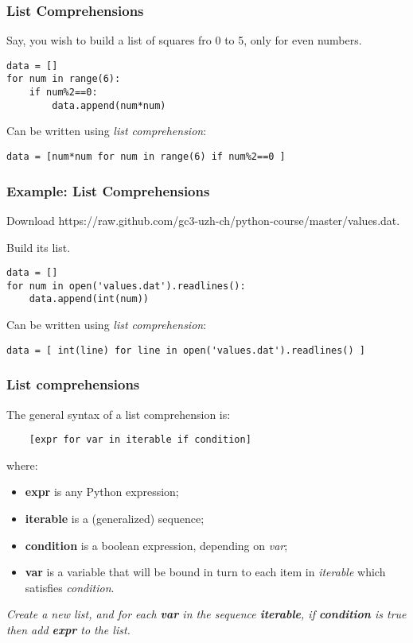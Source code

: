 \begin{frame}[fragile]\frametitle{List Comprehensions}
Say, you wish to build a list of squares fro 0 to 5, only for even numbers.
  \begin{lstlisting}
data = []
for num in range(6):
    if num%2==0:
        data.append(num*num)
  \end{lstlisting}
  
 Can be written using \textit{list comprehension}:
  \begin{lstlisting}
data = [num*num for num in range(6) if num%2==0 ]
  \end{lstlisting}

\end{frame}

\begin{frame}[fragile]\frametitle{Example: List Comprehensions}
 
Download  https://raw.github.com/gc3-uzh-ch/python-course/master/values.dat.

Build its list.
  \begin{lstlisting}
data = []
for num in open('values.dat').readlines():
    data.append(int(num))
  \end{lstlisting}
  
 Can be written using \textit{list comprehension}:
  \begin{lstlisting}
data = [ int(line) for line in open('values.dat').readlines() ]
  \end{lstlisting}

\end{frame}

\begin{frame}[fragile]\frametitle{List comprehensions}
  \def\e{\ttfamily\itshape}

  The general syntax of a list comprehension is:
  \begin{lstlisting}
    [expr for var in iterable if condition]
  \end{lstlisting}
  where:
  \begin{itemize}
  \item{\bf expr} is any Python expression;
  \item{\bf iterable} is a (generalized) sequence;
  \item {\bf condition} is a boolean expression, depending on
    {\e var};
  \item {\bf var} is a variable that will be bound in turn to each item
    in {\e iterable} which satisfies {\e condition}.
  \end{itemize}

   \textit{Create a new list, and for each \textbf{var} in the
    sequence \textbf{iterable}, if \textbf{condition} is true then add
    \textbf{expr} to the list.}
\end{frame}

